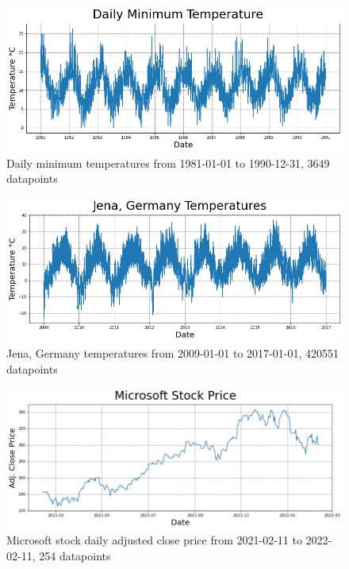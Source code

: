 \documentclass[conference]{IEEEtran}
\begin{document}
\begin{figure}
\begin{center}
\includegraphics[scale=0.42]{DailyMinTemp_time_series.png}
\caption{Daily minimum temperatures from 1981-01-01 to 1990-12-31, 3649 datapoints}
\label{fig:DailyMinTemp_time_series}
\end{center}
\end{figure}

\begin{figure}
\begin{center}
\includegraphics[scale=0.42]{Jena_time_series.png}
\caption{Jena, Germany temperatures from 2009-01-01 to 2017-01-01, 420551 datapoints}
\label{fig:Jena_time_series}
\end{center}
\end{figure}

\begin{figure}
\begin{center}
\includegraphics[scale=0.42]{MSFT_time_series.png}
\caption{Microsoft stock daily adjusted close price from 2021-02-11 to 2022-02-11, 254 datapoints}
\label{fig:MSFT_time_series}
\end{center}
\end{figure}
\end{document}
